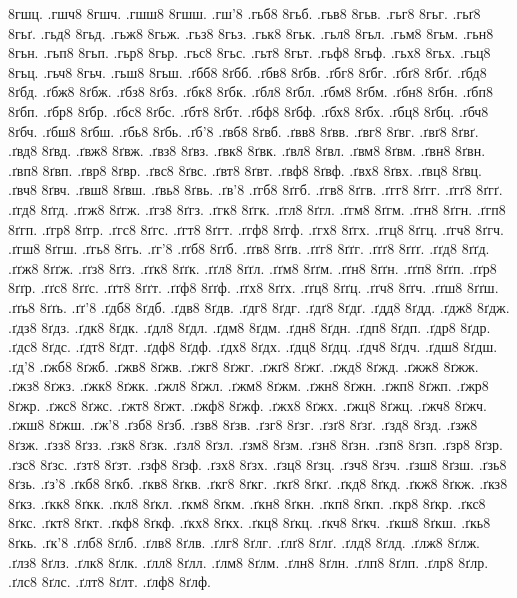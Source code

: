 {8гшц.
.гшч8
8гшч.
.гшш8
8гшш.
.гш'8
.гьб8
8гьб.
.гьв8
8гьв.
.гьг8
8гьг.
.гьґ8
8гьґ.
.гьд8
8гьд.
.гьж8
8гьж.
.гьз8
8гьз.
.гьк8
8гьк.
.гьл8
8гьл.
.гьм8
8гьм.
.гьн8
8гьн.
.гьп8
8гьп.
.гьр8
8гьр.
.гьс8
8гьс.
.гьт8
8гьт.
.гьф8
8гьф.
.гьх8
8гьх.
.гьц8
8гьц.
.гьч8
8гьч.
.гьш8
8гьш.
.ґбб8
8ґбб.
.ґбв8
8ґбв.
.ґбг8
8ґбг.
.ґбґ8
8ґбґ.
.ґбд8
8ґбд.
.ґбж8
8ґбж.
.ґбз8
8ґбз.
.ґбк8
8ґбк.
.ґбл8
8ґбл.
.ґбм8
8ґбм.
.ґбн8
8ґбн.
.ґбп8
8ґбп.
.ґбр8
8ґбр.
.ґбс8
8ґбс.
.ґбт8
8ґбт.
.ґбф8
8ґбф.
.ґбх8
8ґбх.
.ґбц8
8ґбц.
.ґбч8
8ґбч.
.ґбш8
8ґбш.
.ґбь8
8ґбь.
.ґб'8
.ґвб8
8ґвб.
.ґвв8
8ґвв.
.ґвг8
8ґвг.
.ґвґ8
8ґвґ.
.ґвд8
8ґвд.
.ґвж8
8ґвж.
.ґвз8
8ґвз.
.ґвк8
8ґвк.
.ґвл8
8ґвл.
.ґвм8
8ґвм.
.ґвн8
8ґвн.
.ґвп8
8ґвп.
.ґвр8
8ґвр.
.ґвс8
8ґвс.
.ґвт8
8ґвт.
.ґвф8
8ґвф.
.ґвх8
8ґвх.
.ґвц8
8ґвц.
.ґвч8
8ґвч.
.ґвш8
8ґвш.
.ґвь8
8ґвь.
.ґв'8
.ґгб8
8ґгб.
.ґгв8
8ґгв.
.ґгг8
8ґгг.
.ґгґ8
8ґгґ.
.ґгд8
8ґгд.
.ґгж8
8ґгж.
.ґгз8
8ґгз.
.ґгк8
8ґгк.
.ґгл8
8ґгл.
.ґгм8
8ґгм.
.ґгн8
8ґгн.
.ґгп8
8ґгп.
.ґгр8
8ґгр.
.ґгс8
8ґгс.
.ґгт8
8ґгт.
.ґгф8
8ґгф.
.ґгх8
8ґгх.
.ґгц8
8ґгц.
.ґгч8
8ґгч.
.ґгш8
8ґгш.
.ґгь8
8ґгь.
.ґг'8
.ґґб8
8ґґб.
.ґґв8
8ґґв.
.ґґг8
8ґґг.
.ґґґ8
8ґґґ.
.ґґд8
8ґґд.
.ґґж8
8ґґж.
.ґґз8
8ґґз.
.ґґк8
8ґґк.
.ґґл8
8ґґл.
.ґґм8
8ґґм.
.ґґн8
8ґґн.
.ґґп8
8ґґп.
.ґґр8
8ґґр.
.ґґс8
8ґґс.
.ґґт8
8ґґт.
.ґґф8
8ґґф.
.ґґх8
8ґґх.
.ґґц8
8ґґц.
.ґґч8
8ґґч.
.ґґш8
8ґґш.
.ґґь8
8ґґь.
.ґґ'8
.ґдб8
8ґдб.
.ґдв8
8ґдв.
.ґдг8
8ґдг.
.ґдґ8
8ґдґ.
.ґдд8
8ґдд.
.ґдж8
8ґдж.
.ґдз8
8ґдз.
.ґдк8
8ґдк.
.ґдл8
8ґдл.
.ґдм8
8ґдм.
.ґдн8
8ґдн.
.ґдп8
8ґдп.
.ґдр8
8ґдр.
.ґдс8
8ґдс.
.ґдт8
8ґдт.
.ґдф8
8ґдф.
.ґдх8
8ґдх.
.ґдц8
8ґдц.
.ґдч8
8ґдч.
.ґдш8
8ґдш.
.ґд'8
.ґжб8
8ґжб.
.ґжв8
8ґжв.
.ґжг8
8ґжг.
.ґжґ8
8ґжґ.
.ґжд8
8ґжд.
.ґжж8
8ґжж.
.ґжз8
8ґжз.
.ґжк8
8ґжк.
.ґжл8
8ґжл.
.ґжм8
8ґжм.
.ґжн8
8ґжн.
.ґжп8
8ґжп.
.ґжр8
8ґжр.
.ґжс8
8ґжс.
.ґжт8
8ґжт.
.ґжф8
8ґжф.
.ґжх8
8ґжх.
.ґжц8
8ґжц.
.ґжч8
8ґжч.
.ґжш8
8ґжш.
.ґж'8
.ґзб8
8ґзб.
.ґзв8
8ґзв.
.ґзг8
8ґзг.
.ґзґ8
8ґзґ.
.ґзд8
8ґзд.
.ґзж8
8ґзж.
.ґзз8
8ґзз.
.ґзк8
8ґзк.
.ґзл8
8ґзл.
.ґзм8
8ґзм.
.ґзн8
8ґзн.
.ґзп8
8ґзп.
.ґзр8
8ґзр.
.ґзс8
8ґзс.
.ґзт8
8ґзт.
.ґзф8
8ґзф.
.ґзх8
8ґзх.
.ґзц8
8ґзц.
.ґзч8
8ґзч.
.ґзш8
8ґзш.
.ґзь8
8ґзь.
.ґз'8
.ґкб8
8ґкб.
.ґкв8
8ґкв.
.ґкг8
8ґкг.
.ґкґ8
8ґкґ.
.ґкд8
8ґкд.
.ґкж8
8ґкж.
.ґкз8
8ґкз.
.ґкк8
8ґкк.
.ґкл8
8ґкл.
.ґкм8
8ґкм.
.ґкн8
8ґкн.
.ґкп8
8ґкп.
.ґкр8
8ґкр.
.ґкс8
8ґкс.
.ґкт8
8ґкт.
.ґкф8
8ґкф.
.ґкх8
8ґкх.
.ґкц8
8ґкц.
.ґкч8
8ґкч.
.ґкш8
8ґкш.
.ґкь8
8ґкь.
.ґк'8
.ґлб8
8ґлб.
.ґлв8
8ґлв.
.ґлг8
8ґлг.
.ґлґ8
8ґлґ.
.ґлд8
8ґлд.
.ґлж8
8ґлж.
.ґлз8
8ґлз.
.ґлк8
8ґлк.
.ґлл8
8ґлл.
.ґлм8
8ґлм.
.ґлн8
8ґлн.
.ґлп8
8ґлп.
.ґлр8
8ґлр.
.ґлс8
8ґлс.
.ґлт8
8ґлт.
.ґлф8
8ґлф.
}
